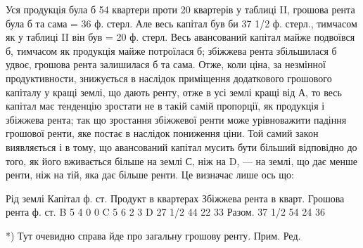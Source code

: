 Уся продукція була б 54 квартери проти 20 квартерів у таблиці II, грошова рента була
б та сама = 36 ф. стерл. Але весь капітал був би 37 1/2 ф. стерл., тимчасом як у таблиці II
він був = 20 ф. стерл. Весь авансований капітал майже подвоївся б, тимчасом як продукція майже
потроїлася б; збіжжева рента збільшилася б удвоє, грошова рента залишилася б та сама.
Отже, коли ціна, за незмінної продуктивности, знижується в наслідок приміщення
додаткового грошового капіталу у кращі землі, що дають ренту, отже
в усі землі кращі від А, то весь капітал має тенденцію зростати не в такій
самій пропорції, як продукція і збіжжева рента; так що зростання збіжжевої ренти
може урівноважити падіння грошової ренти, яке постає в наслідок пониження ціни.
Той самий закон виявляється і в тому, що авансований капітал мусить бути більший
відповідно до того, як його вживається більше на землі С, ніж на D, — на землі,
що дає менше ренти, ніж на тій, яка дає більше ренти. Це визначає лише ось що:

Рід  землі    Капітал ф. ст. Продукт в квартерах    Збіжжева рента в кварт. Грошова рента ф. ст.
B 5 4 0 0
C 5 6 2 3
D    27 1/2    44    22    33
Разом. 37 1/2      54    24    36

*) Тут очевидно справа йде про загальну грошову ренту. Прим. Ред.
